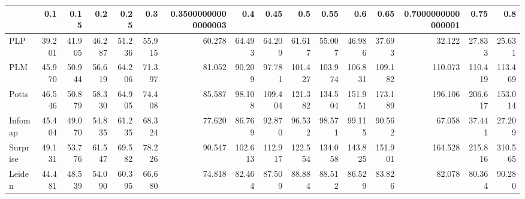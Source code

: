 \begin{tabular}{lrrrrrrrrrrrrrrr}
\toprule
{} &    0.1 &   0.15 &    0.2 &   0.25 &    0.3 & 0.35000000000000003 &     0.4 &    0.45 &     0.5 &    0.55 &     0.6 &    0.65 & 0.7000000000000001 &    0.75 &     0.8 \\
\midrule
PLP      & 39.201 & 41.905 & 46.287 & 51.236 & 55.915 &              60.278 &  64.493 &  64.209 &  61.617 &  55.007 &  46.986 &  37.693 &             32.122 &  27.833 &  25.631 \\
PLM      & 45.970 & 50.944 & 56.619 & 64.206 & 71.397 &              81.052 &  90.209 &  97.781 & 101.427 & 103.974 & 106.831 & 109.182 &            110.073 & 110.419 & 113.469 \\
Potts    & 46.546 & 50.879 & 58.330 & 64.905 & 74.408 &              85.587 &  98.108 & 109.404 & 121.382 & 134.504 & 151.951 & 173.189 &            196.106 & 206.617 & 153.014 \\
Infomap  & 45.404 & 49.070 & 54.835 & 61.235 & 68.324 &              77.620 &  86.769 &  92.870 &  96.532 &  98.571 &  99.115 &  90.562 &             67.058 &  37.441 &  27.209 \\
Surprise & 49.131 & 53.776 & 61.547 & 69.582 & 78.226 &              90.547 & 102.613 & 112.917 & 122.554 & 134.058 & 143.825 & 151.901 &            164.528 & 215.816 & 310.565 \\
Leiden   & 44.481 & 48.539 & 54.090 & 60.395 & 66.680 &              74.818 &  82.464 &  87.509 &  88.884 &  88.512 &  86.529 &  83.826 &             82.078 &  80.364 &  90.280 \\
\bottomrule
\end{tabular}
